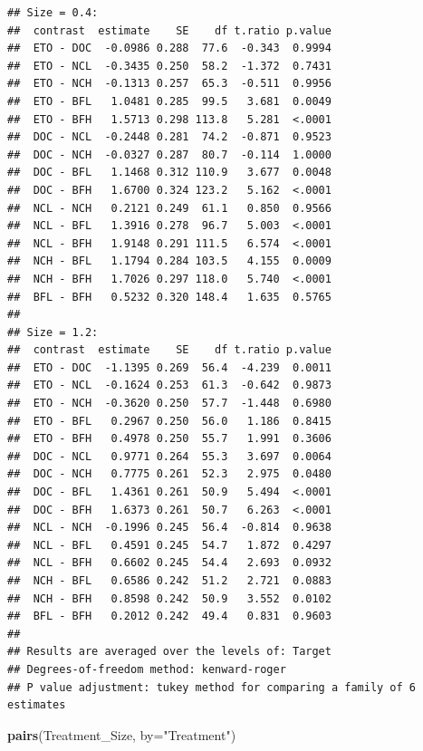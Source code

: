 \documentclass[
]{article}
\newenvironment{Shaded}{\begin{snugshade}}{\end{snugshade}}
\newcommand{\AttributeTok}[1]{\textcolor[rgb]{0.13,0.29,0.53}{#1}}
\newcommand{\FunctionTok}[1]{\textcolor[rgb]{0.13,0.29,0.53}{\textbf{#1}}}
\newcommand{\NormalTok}[1]{#1}
\newcommand{\StringTok}[1]{\textcolor[rgb]{0.31,0.60,0.02}{#1}}
\begin{document}
\begin{verbatim}
## Size = 0.4:
##  contrast  estimate    SE    df t.ratio p.value
##  ETO - DOC  -0.0986 0.288  77.6  -0.343  0.9994
##  ETO - NCL  -0.3435 0.250  58.2  -1.372  0.7431
##  ETO - NCH  -0.1313 0.257  65.3  -0.511  0.9956
##  ETO - BFL   1.0481 0.285  99.5   3.681  0.0049
##  ETO - BFH   1.5713 0.298 113.8   5.281  <.0001
##  DOC - NCL  -0.2448 0.281  74.2  -0.871  0.9523
##  DOC - NCH  -0.0327 0.287  80.7  -0.114  1.0000
##  DOC - BFL   1.1468 0.312 110.9   3.677  0.0048
##  DOC - BFH   1.6700 0.324 123.2   5.162  <.0001
##  NCL - NCH   0.2121 0.249  61.1   0.850  0.9566
##  NCL - BFL   1.3916 0.278  96.7   5.003  <.0001
##  NCL - BFH   1.9148 0.291 111.5   6.574  <.0001
##  NCH - BFL   1.1794 0.284 103.5   4.155  0.0009
##  NCH - BFH   1.7026 0.297 118.0   5.740  <.0001
##  BFL - BFH   0.5232 0.320 148.4   1.635  0.5765
## 
## Size = 1.2:
##  contrast  estimate    SE    df t.ratio p.value
##  ETO - DOC  -1.1395 0.269  56.4  -4.239  0.0011
##  ETO - NCL  -0.1624 0.253  61.3  -0.642  0.9873
##  ETO - NCH  -0.3620 0.250  57.7  -1.448  0.6980
##  ETO - BFL   0.2967 0.250  56.0   1.186  0.8415
##  ETO - BFH   0.4978 0.250  55.7   1.991  0.3606
##  DOC - NCL   0.9771 0.264  55.3   3.697  0.0064
##  DOC - NCH   0.7775 0.261  52.3   2.975  0.0480
##  DOC - BFL   1.4361 0.261  50.9   5.494  <.0001
##  DOC - BFH   1.6373 0.261  50.7   6.263  <.0001
##  NCL - NCH  -0.1996 0.245  56.4  -0.814  0.9638
##  NCL - BFL   0.4591 0.245  54.7   1.872  0.4297
##  NCL - BFH   0.6602 0.245  54.4   2.693  0.0932
##  NCH - BFL   0.6586 0.242  51.2   2.721  0.0883
##  NCH - BFH   0.8598 0.242  50.9   3.552  0.0102
##  BFL - BFH   0.2012 0.242  49.4   0.831  0.9603
## 
## Results are averaged over the levels of: Target 
## Degrees-of-freedom method: kenward-roger 
## P value adjustment: tukey method for comparing a family of 6 estimates
\end{verbatim}

\begin{Shaded}
\begin{Highlighting}[]
\FunctionTok{pairs}\NormalTok{(Treatment\_Size, }\AttributeTok{by=}\StringTok{"Treatment"}\NormalTok{)}
\end{Highlighting}
\end{Shaded}
\end{document}
